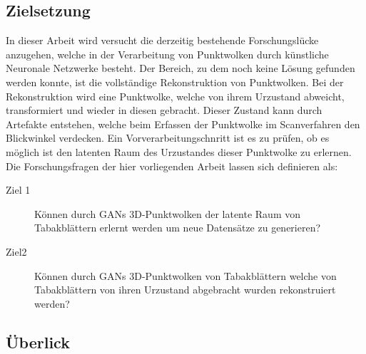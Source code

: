 \documentclass{llncs}
\begin{document}
\subsection{Zielsetzung}\label{ref:objective}

In dieser Arbeit wird versucht die derzeitig bestehende Forschungslücke anzugehen, welche in der Verarbeitung von Punktwolken durch künstliche Neuronale Netzwerke besteht. Der Bereich, zu dem noch keine Lösung gefunden werden konnte, ist die vollständige Rekonstruktion von Punktwolken. Bei der Rekonstruktion wird eine Punktwolke, welche von ihrem Urzustand abweicht, transformiert und wieder in diesen gebracht. Dieser Zustand kann durch Artefakte entstehen, welche beim Erfassen der Punktwolke im Scanverfahren den Blickwinkel verdecken. Ein Vorverarbeitungschnritt ist es zu prüfen, ob es möglich ist den latenten Raum des Urzustandes dieser Punktwolke zu erlernen. Die Forschungsfragen der hier vorliegenden Arbeit lassen sich definieren als:\\


\begin{description}
\item[Ziel 1]
Können durch GANs 3D-Punktwolken der latente Raum von Tabakblättern erlernt werden um neue Datensätze zu generieren?\\
 	
\item[Ziel2] Können durch GANs 3D-Punktwolken von Tabakblättern welche von Tabakblättern von ihren Urzustand abgebracht wurden rekonstruiert werden? 
\end{description}

\subsection{Überlick}
\end{document}
